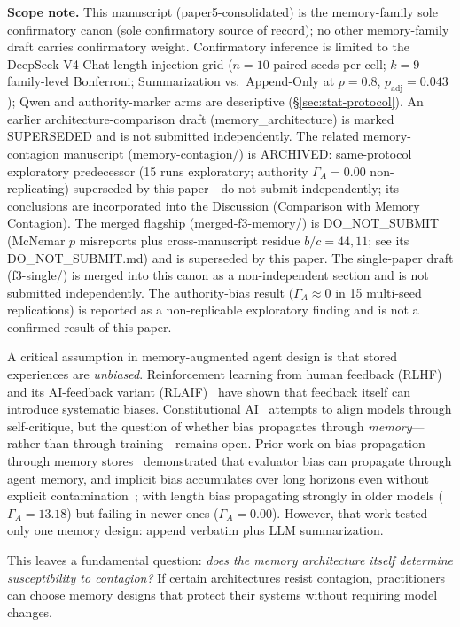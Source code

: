 \documentclass[11pt]{article}
\begin{document}
\textbf{Scope note.} This manuscript (paper5-consolidated) is the memory-family sole confirmatory canon (sole confirmatory source of record); no other memory-family draft carries confirmatory weight. Confirmatory inference is limited to the DeepSeek V4-Chat length-injection grid ($n{=}10$ paired seeds per cell; $k{=}9$ family-level Bonferroni; Summarization vs.\ Append-Only at $p{=}0.8$, $p_{\text{adj}}{=}0.043$); Qwen and authority-marker arms are descriptive (\S\ref{sec:stat-protocol}). An earlier architecture-comparison draft (memory\_architecture) is marked SUPERSEDED and is not submitted independently. The related memory-contagion manuscript (memory-contagion/) is ARCHIVED: same-protocol exploratory predecessor (15 runs exploratory; authority $\Gamma_A{=}0.00$ non-replicating) superseded by this paper---do not submit independently; its conclusions are incorporated into the Discussion (Comparison with Memory Contagion). The merged flagship (merged-f3-memory/) is DO\_NOT\_SUBMIT (McNemar $p$ misreports plus cross-manuscript residue $b/c{=}44{,}11$; see its DO\_NOT\_SUBMIT.md) and is superseded by this paper. The single-paper draft (f3-single/) is merged into this canon as a non-independent section and is not submitted independently. The authority-bias result ($\Gamma_A \approx 0$ in 15 multi-seed replications) is reported as a non-replicable exploratory finding and is not a confirmed result of this paper.

A critical assumption in memory-augmented agent design is that stored experiences are \emph{unbiased}. Reinforcement learning from human feedback (RLHF)~\cite{christiano2017deep,ouyang2022training} and its AI-feedback variant (RLAIF)~\cite{lee2023rlaif} have shown that feedback itself can introduce systematic biases. Constitutional AI~\cite{bai2022constitutional} attempts to align models through self-critique, but the question of whether bias propagates through \emph{memory}---rather than through training---remains open. Prior work on bias propagation through memory stores~\cite{bertalanic2026cost,huang2026cagecal,ma2026implicitbias} demonstrated that evaluator bias can propagate through agent memory, and implicit bias accumulates over long horizons even without explicit contamination~\cite{ma2026implicitbias}; with length bias propagating strongly in older models ($\Gamma_A = 13.18$) but failing in newer ones ($\Gamma_A = 0.00$). However, that work tested only one memory design: append verbatim plus LLM summarization.

This leaves a fundamental question: \emph{does the memory architecture itself determine susceptibility to contagion?} If certain architectures resist contagion, practitioners can choose memory designs that protect their systems without requiring model changes.
\end{document}
